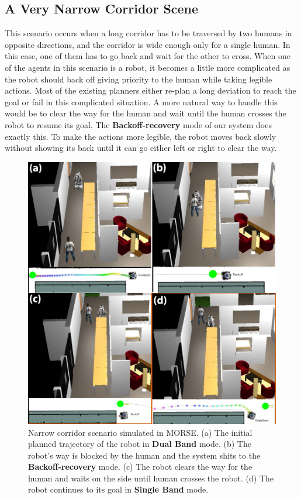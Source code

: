 \subsection{A Very Narrow Corridor Scene}
This scenario occurs when a long corridor has to be traversed by two humans in opposite directions, and the corridor is wide enough only for a single human. In this case, one of them has to go back and wait for the other to cross. When one of the agents in this scenario is a robot, it becomes a little more complicated as the robot should back off giving priority to the human while taking legible actions. Most of the existing planners either re-plan a long deviation to reach the goal or fail in this complicated situation. A more natural way to handle this would be to clear the way for the human and wait until the human crosses the robot to resume its goal. The \textbf{Backoff-recovery} mode of our system does exactly this. To make the actions more legible, the robot moves back slowly without showing its back until it can go either left or right to clear the way. 
\begin{figure}[!h]
    \centering
    \includegraphics[width=\columnwidth]{images/chapter4/narrow_combined_2.png}
    \caption{Narrow corridor scenario simulated in MORSE. (a) The initial planned trajectory of the robot in \textbf{Dual Band} mode. (b) The robot's way is blocked by the human and the system shits to the \textbf{Backoff-recovery} mode. (c) The robot clears the way for the human and waits on the side until human crosses the robot. (d) The robot continues to its goal in \textbf{Single Band} mode.} 
    \label{fig:narrow}
\end{figure}

